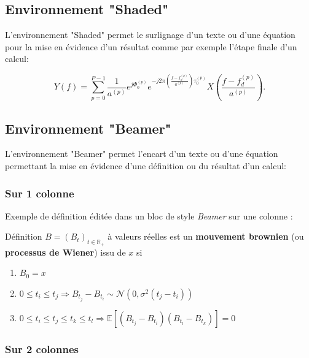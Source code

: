 \documentclass[11pt,a4paper,french]{article}
\def\Rset{\mathbb{R}} %
\def\Eset{\mathbb{E}} %
\begin{document}
\subsection{Environnement "Shaded"}\label{sec:SS_ENV1}

L'environnement "Shaded" permet le surlignage d'un texte ou d'une équation pour la mise en évidence d'un résultat  comme par exemple l'étape finale d'un calcul:

\begin{shaded}
	\begin{equation}
		\label{E_SIGN_RX_BB_FREQ}
		Y(f) = \sum_{p=0}^{P-1}\frac{1}{a^{(p)}} e^{j\Phi_0^{(p)}}e^{-j2\pi \left(\frac{f-f_d^{(p)}}{a^{(p)}}\right)\tau_0^{(p)}}
		X\left(\frac{f-f_d^{(p)}}{a^{(p)}}\right).
	\end{equation}
\end{shaded}


\subsection{Environnement "Beamer"}\label{sec:SS_ENV2}

L'environnement "Beamer" permet l'encart d'un  texte ou d'une équation permettant la mise en évidence d'une définition ou du résultat d'un calcul:

\subsubsection{Sur 1 colonne}\label{sec:SSS_ENV2}

Exemple de définition éditée dans un bloc de style \emph{Beamer} sur une colonne :

\begin{beamerblock}{Définition}
$B=(B_t)_{t\in\Rset_+}$ \`a valeurs r\'eelles est un {\bf mouvement brownien} (ou {\bf processus de Wiener}) issu de $x$ si
\begin{enumerate} 
\item $B_0=x$ 
\item $0\leq t_i\leq t_j \Rightarrow B_{t_j}-B_{t_i}\sim \mathcal{N}(0,\sigma^2(t_j-t_i))$
\item $0\leq t_i\leq t_j\leq t_k\leq t_l \Rightarrow \Eset[(B_{t_j}-B_{t_i})(B_{t_l}-B_{t_k})]=0$
\end{enumerate}
\end{beamerblock}

\subsubsection{Sur 2 colonnes}\label{sec:SSS_ENV3}
\end{document}
